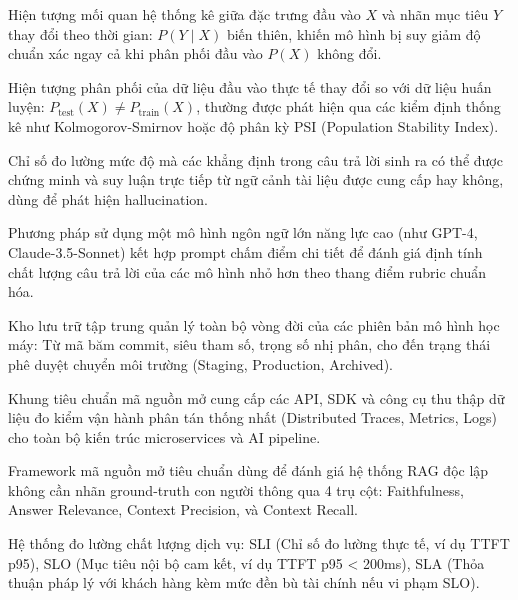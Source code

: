 \begin{description}[leftmargin=2.5cm, style=nextline]
  \item[\term{Concept Drift}] Hiện tượng mối quan hệ thống kê giữa đặc trưng đầu vào $X$ và nhãn mục tiêu $Y$ thay đổi theo thời gian: $P(Y \mid X)$ biến thiên, khiến mô hình bị suy giảm độ chuẩn xác ngay cả khi phân phối đầu vào $P(X)$ không đổi.

  \item[\term{Data Drift (Covariate Shift)}] Hiện tượng phân phối của dữ liệu đầu vào thực tế thay đổi so với dữ liệu huấn luyện: $P_{\text{test}}(X) \neq P_{\text{train}}(X)$, thường được phát hiện qua các kiểm định thống kê như Kol\-mo\-go\-rov-Smir\-nov hoặc độ phân kỳ PSI (Population Stability Index).

  \item[\term{Faithfulness (Độ Trung Thực RAG)}] Chỉ số đo lường mức độ mà các khẳng định trong câu trả lời sinh ra có thể được chứng minh và suy luận trực tiếp từ ngữ cảnh tài liệu được cung cấp hay không, dùng để phát hiện hallucination.

  \item[\term{LLM-as-a-Judge}] Phương pháp sử dụng một mô hình ngôn ngữ lớn năng lực cao (như GPT-4, Claude-3.5-Sonnet) kết hợp prompt chấm điểm chi tiết để đánh giá định tính chất lượng câu trả lời của các mô hình nhỏ hơn theo thang điểm rubric chuẩn hóa.

  \item[\term{Model Registry}] Kho lưu trữ tập trung quản lý toàn bộ vòng đời của các phiên bản mô hình học máy: Từ mã băm commit, siêu tham số, trọng số nhị phân, cho đến trạng thái phê duyệt chuyển môi trường (Staging, Production, Archived).

  \item[\term{OpenTelemetry (OTel)}] Khung tiêu chuẩn mã nguồn mở cung cấp các API, SDK và công cụ thu thập dữ liệu đo kiểm vận hành phân tán thống nhất (Distributed Traces, Metrics, Logs) cho toàn bộ kiến trúc microservices và AI pipeline.

  \item[\term{Ragas}] Framework mã nguồn mở tiêu chuẩn dùng để đánh giá hệ thống RAG độc lập không cần nhãn ground-truth con người thông qua 4 trụ cột: Faithfulness, Answer Relevance, Context Precision, và Context Recall.

  \item[\term{SLA / SLO / SLI}] Hệ thống đo lường chất lượng dịch vụ: SLI (Chỉ số đo lường thực tế, ví dụ TTFT p95), SLO (Mục tiêu nội bộ cam kết, ví dụ TTFT p95 < 200ms), SLA (Thỏa thuận pháp lý với khách hàng kèm mức đền bù tài chính nếu vi phạm SLO).
\end{description}
